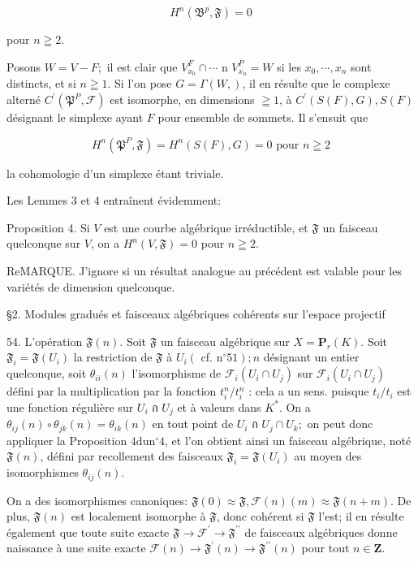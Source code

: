 $$
H^{n}\left(\mathfrak{B}^{p}, \mathfrak{F}\right)=0
$$

pour $n \geqq 2$.

Posons $W=V-F ;$ il est clair que $V_{x_{0}}^{F} \cap \cdots$ n $V_{x_{n}}^{P}=W$ si les $x_{0}, \cdots, x_{n}$ sont distincts, et si $n \geqq 1$. Si l'on pose $G=\Gamma(W, \mathfrak{})$, il en résulte que le complexe alterné $C^{\prime}\left(\mathfrak{P}^{P}, \mathcal{F}\right)$ est isomorphe, en dimensions $\geqq 1$, à $C^{\prime}(S(F), G), S(F)$ désignant le simplexe ayant $F$ pour ensemble de sommets. Il s'ensuit que

$$
H^{n}\left(\mathfrak{P}^{P}, \mathfrak{F}\right)=H^{n}(S(F), G)=0 \text { pour } n \geqq 2
$$

la cohomologie d'un simplexe étant triviale.

Les Lemmes 3 et 4 entraînent évidemment:

Proposition 4. Si $V$ est une courbe algébrique irréductible, et $\mathfrak{F}$ un faisceau quelconque sur $V$, on a $H^{n}(V, \mathfrak{F})=0$ pour $n \geqq 2$.

ReMARQUE. J'ignore si un résultat analogue au précédent est valable pour les variétés de dimension quelconque.

§2. Modules gradués et faisceaux algébriques cohérents sur l'espace projectif

54. L'opération $\mathfrak{F}(n) .$ Soit $\mathfrak{F}$ un faisceau algébrique sur $X=\mathbf{P}_{r}(K) .$ Soit $\mathfrak{F}_{i}=\mathfrak{F}\left(U_{i}\right)$ la restriction de $\mathfrak{F}$ à $U_{i}\left(\right.$ cf. $\left.\mathrm{n}^{\circ} 51\right) ; n$ désignant un entier quelconque, soit $\theta_{i i}(n)$ l'isomorphisme de $\mathcal{F}_{i}\left(U_{i} \cap U_{j}\right)$ sur $\mathcal{F}_{i}\left(U_{i} \cap U_{j}\right)$ défini par la multiplication par la fonction $t_{i}^{n} / t_{i}^{n}$ : cela a un sens. puisque $t_{i} / t_{i}$ est une fonction régulière sur $U_{i}$ ก $U_{j}$ et à valeurs dans $K^{*}$. On a $\theta_{i j}(n) \circ \theta_{j k}(n)=\theta_{i k}(n)$ en tout point de $U_{i}$ ก $U_{j} \cap U_{k} ;$ on peut donc appliquer la Proposition $4 \mathrm{du} \mathrm{n}^{\circ} 4$, et l'on obtient ainsi un faisceau algébrique, noté $\mathfrak{F}(n)$, défini par recollement des faisceaux $\mathfrak{F}_{i}=\mathfrak{F}\left(U_{i}\right)$ au moyen des isomorphismes $\theta_{i j}(n)$.

On a des isomorphismes canoniques: $\mathfrak{F}(0) \approx \mathfrak{F}, \mathcal{F}(n)(m) \approx \mathfrak{F}(n+m)$. De plus, $\mathfrak{F}(n)$ est localement isomorphe à $\mathfrak{F}$, donc cohérent si $\mathfrak{F}$ l'est; il en résulte également que toute suite exacte $\mathfrak{F} \rightarrow \mathcal{F}^{\prime} \rightarrow \mathfrak{F}^{\prime \prime}$ de faisceaux algébriques donne naissance à une suite exacte $\mathcal{F}(n) \rightarrow \mathfrak{F}^{\prime}(n) \rightarrow \mathfrak{F}^{\prime \prime}(n)$ pour tout $n \in \mathbf{Z}$.

